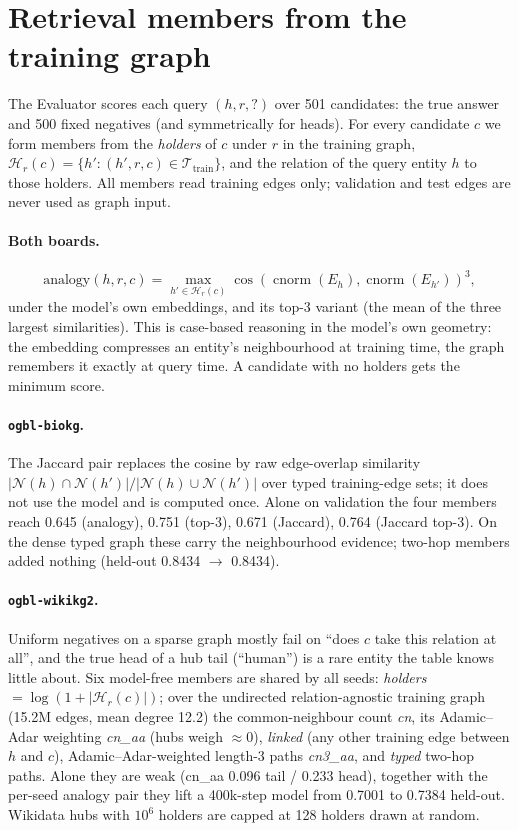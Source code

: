 \documentclass[11pt,a4paper]{article}
\newcommand{\cnorm}{\operatorname{cnorm}}
\begin{document}
\section{Retrieval members from the training graph}
\label{sec:retrieval}

The Evaluator scores each query $(h,r,?)$ over 501 candidates: the true
answer and 500 fixed negatives (and symmetrically for heads). For every
candidate $c$ we form members from the \emph{holders} of $c$ under $r$ in
the training graph, $\mathcal{H}_r(c)=\{h' : (h',r,c)\in
\mathcal{T}_{\text{train}}\}$, and the relation of the query entity $h$
to those holders. All members read training edges only; validation and
test edges are never used as graph input.

\paragraph{Both boards.}
\begin{equation}
  \text{analogy}(h,r,c) = \max_{h'\in\mathcal{H}_r(c)}
     \cos(\cnorm(E_h),\cnorm(E_{h'}))^{3},
\end{equation}
under the model's own embeddings, and its top-3 variant (the mean of the
three largest similarities). This is case-based reasoning in the model's
own geometry: the embedding compresses an entity's neighbourhood at
training time, the graph remembers it exactly at query time. A candidate
with no holders gets the minimum score.

\paragraph{\texttt{ogbl-biokg}.}
The Jaccard pair replaces the cosine by raw edge-overlap similarity
$|\mathcal{N}(h)\cap\mathcal{N}(h')|/|\mathcal{N}(h)\cup\mathcal{N}(h')|$
over typed training-edge sets; it does not use the model and is computed
once. Alone on validation the four members reach 0.645 (analogy), 0.751
(top-3), 0.671 (Jaccard), 0.764 (Jaccard top-3). On the dense typed graph
these carry the neighbourhood evidence; two-hop members added nothing
(held-out 0.8434 $\to$ 0.8434).

\paragraph{\texttt{ogbl-wikikg2}.}
Uniform negatives on a sparse graph mostly fail on ``does $c$ take this
relation at all'', and the true head of a hub tail (``human'') is a rare
entity the table knows little about. Six model-free members are shared by
all seeds: \emph{holders} $=\log(1+|\mathcal{H}_r(c)|)$; over the
undirected relation-agnostic training graph (15.2M edges, mean degree
12.2) the common-neighbour count \emph{cn}, its Adamic--Adar weighting
\emph{cn\_aa} (hubs weigh $\approx0$), \emph{linked} (any other training
edge between $h$ and $c$), Adamic--Adar-weighted length-3 paths
\emph{cn3\_aa}, and \emph{typed} two-hop paths. Alone they are weak
(cn\_aa 0.096 tail / 0.233 head), together with the per-seed analogy pair
they lift a 400k-step model from 0.7001 to 0.7384 held-out. Wikidata hubs
with $10^6$ holders are capped at 128 holders drawn at random.
\end{document}
